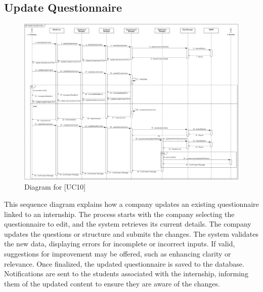 \subsection{Update Questionnaire}
\begin{figure} [H]
    \centering
    \includegraphics[width=1\linewidth]{DD/Images/Runtime Sequence Diagram Images/update_questionnaire.png}
    \caption{Diagram for [UC10]}
    \label{fig: Update Questionnaire Diagram}
\end{figure}

This sequence diagram explains how a company updates an existing questionnaire linked to an internship. The process starts with the company selecting the questionnaire to edit, and the system retrieves its current details. The company updates the questions or structure and submits the changes. The system validates the new data, displaying errors for incomplete or incorrect inputs. If valid, suggestions for improvement may be offered, such as enhancing clarity or relevance. Once finalized, the updated questionnaire is saved to the database. Notifications are sent to the students associated with the internship, informing them of the updated content to ensure they are aware of the changes.

